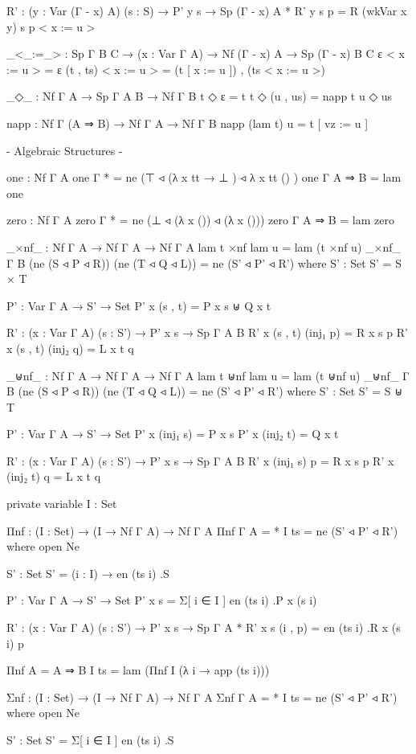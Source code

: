 \begin{code}
    R' : (y : Var (Γ - x) A) (s : S) → P' y s → Sp (Γ - x) A *
    R' y s p = R (wkVar x y) s p < x := u >

  _<_:=_> : Sp Γ B C → (x : Var Γ A) → Nf (Γ - x) A → Sp (Γ - x) B C
  ε < x := u > = ε
  (t , ts) < x := u > = (t [ x := u ]) , (ts < x := u >)

  _◇_ : Nf Γ A → Sp Γ A B → Nf Γ B
  t ◇ ε = t
  t ◇ (u , us) = napp t u ◇ us

  napp : Nf Γ (A ⇒ B) → Nf Γ A → Nf Γ B
  napp (lam t) u = t [ vz := u ]

{- Algebraic Structures -}

one : Nf Γ A
one {Γ} {*} = ne (⊤ ◃ (λ{ x tt → ⊥ }) ◃ λ{ x tt () })
one {Γ} {A ⇒ B} = lam one

zero : Nf Γ A
zero {Γ} {*} = ne (⊥ ◃ (λ x ()) ◃ (λ x ()))
zero {Γ} {A ⇒ B} = lam zero

_×nf_ : Nf Γ A → Nf Γ A → Nf Γ A
lam t ×nf lam u = lam (t ×nf u)
_×nf_ {Γ} {B} (ne (S ◃ P ◃ R)) (ne (T ◃ Q ◃ L)) = ne (S' ◃ P' ◃ R')
  where
  S' : Set
  S' = S × T

  P' : Var Γ A → S' → Set
  P' x (s , t) = P x s ⊎ Q x t

  R' : (x : Var Γ A) (s : S') → P' x s → Sp Γ A B
  R' x (s , t) (inj₁ p) = R x s p
  R' x (s , t) (inj₂ q) = L x t q

_⊎nf_ : Nf Γ A → Nf Γ A → Nf Γ A
lam t ⊎nf lam u = lam (t ⊎nf u)
_⊎nf_ {Γ} {B} (ne (S ◃ P ◃ R)) (ne (T ◃ Q ◃ L)) = ne (S' ◃ P' ◃ R')
  where
  S' : Set
  S' = S ⊎ T

  P' : Var Γ A → S' → Set
  P' x (inj₁ s) = P x s
  P' x (inj₂ t) = Q x t

  R' : (x : Var Γ A) (s : S') → P' x s → Sp Γ A B
  R' x (inj₁ s) p = R x s p
  R' x (inj₂ t) q = L x t q

private variable
  I : Set

Πnf : (I : Set) → (I → Nf Γ A) → Nf Γ A
Πnf {Γ} {A = *} I ts = ne (S' ◃ P' ◃ R')
  where
  open Ne
  
  S' : Set
  S' = (i : I) → en (ts i) .S

  P' : Var Γ A → S' → Set
  P' x s = Σ[ i ∈ I ] en (ts i) .P x (s i)

  R' : (x : Var Γ A) (s : S') → P' x s → Sp Γ A *
  R' x s (i , p) = en (ts i) .R x (s i) p
  
Πnf {A = A ⇒ B} I ts = lam (Πnf I (λ i → app (ts i)))

Σnf : (I : Set) → (I → Nf Γ A) → Nf Γ A
Σnf {Γ} {A = *} I ts = ne (S' ◃ P' ◃ R')
  where
  open Ne

  S' : Set
  S' = Σ[ i ∈ I ] en (ts i) .S


\end{code}
